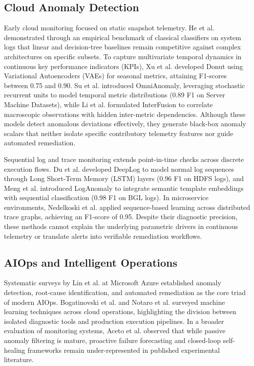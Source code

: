 \documentclass[conference]{IEEEtran}
\begin{document}
\subsection{Cloud Anomaly Detection}

Early cloud monitoring focused on static snapshot telemetry. He et al. \cite{He2016Logs} demonstrated through an empirical benchmark of classical classifiers on system logs that linear and decision-tree baselines remain competitive against complex architectures on specific subsets. To capture multivariate temporal dynamics in continuous key performance indicators (KPIs), Xu et al. \cite{Xu2018Donut} developed Donut using Variational Autoencoders (VAEs) for seasonal metrics, attaining F1-scores between 0.75 and 0.90. Su et al. \cite{Su2019OmniAnomaly} introduced OmniAnomaly, leveraging stochastic recurrent units to model temporal metric distributions (0.89 F1 on Server Machine Datasets), while Li et al. \cite{Li2021InterFusion} formulated InterFusion to correlate macroscopic observations with hidden inter-metric dependencies. Although these models detect anomalous deviations effectively, they generate black-box anomaly scalars that neither isolate specific contributory telemetry features nor guide automated remediation.

Sequential log and trace monitoring extends point-in-time checks across discrete execution flows. Du et al. \cite{Du2017DeepLog} developed DeepLog to model normal log sequences through Long Short-Term Memory (LSTM) layers (0.96 F1 on HDFS logs), and Meng et al. \cite{Meng2019LogAnomaly} introduced LogAnomaly to integrate semantic template embeddings with sequential classification (0.98 F1 on BGL logs). In microservice environments, Nedelkoski et al. \cite{Nedelkoski2019Tracing} applied sequence-based learning across distributed trace graphs, achieving an F1-score of 0.95. Despite their diagnostic precision, these methods cannot explain the underlying parametric drivers in continuous telemetry or translate alerts into verifiable remediation workflows.

\subsection{AIOps and Intelligent Operations}

Systematic surveys by Lin et al. \cite{Lin2019AIOps} at Microsoft Azure established anomaly detection, root-cause identification, and automated remediation as the core triad of modern AIOps. Bogatinovski et al. \cite{Bogatinovski2022AIOps} and Notaro et al. \cite{Notaro2021AIOps} surveyed machine learning techniques across cloud operations, highlighting the division between isolated diagnostic tools and production execution pipelines. In a broader evaluation of monitoring systems, Aceto et al. \cite{Aceto2013CloudMonitoring} observed that while passive anomaly filtering is mature, proactive failure forecasting and closed-loop self-healing frameworks remain under-represented in published experimental literature.
\end{document}
